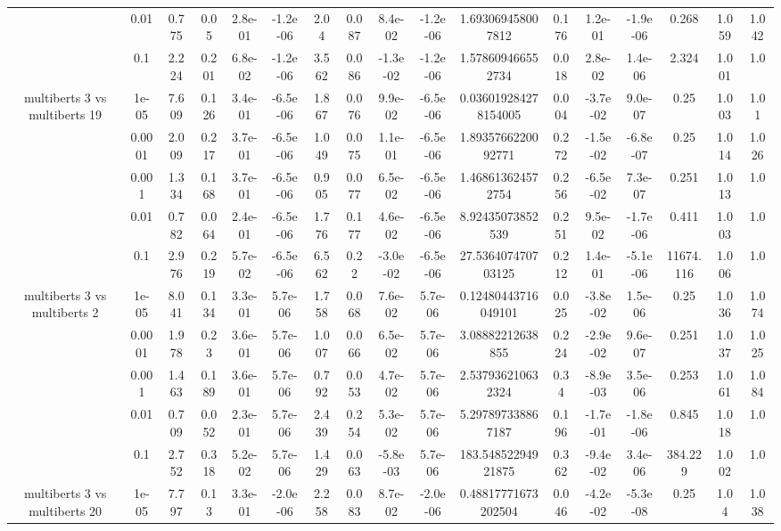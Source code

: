 \begin{tabular}{|c|c|c|c|c|c|c|c|c|c|c|c|c|c|c|c|c|}
 & 0.01 & 0.775 & 0.05 & 2.8e-01 & -1.2e-06 & 2.04 & 0.087 & 8.4e-02 & -1.2e-06 & 1.693069458007812 & 0.176 & 1.2e-01 & -1.9e-06 & 0.268 & 1.059 & 1.042 \\
 & 0.1 & 2.224 & 0.201 & 6.8e-02 & -1.2e-06 & 3.562 & 0.086 & -1.3e-02 & -1.2e-06 & 1.578609466552734 & 0.018 & 2.8e-02 & 1.4e-06 & 2.324 & 1.001 & 1.0 \\
\hline
\multirow{5}{*}{multiberts 3 vs multiberts 19} & 1e-05 & 7.609 & 0.126 & 3.4e-01 & -6.5e-06 & 1.867 & 0.076 & 9.9e-02 & -6.5e-06 & 0.036019284278154005 & 0.004 & -3.7e-02 & 9.0e-07 & 0.25 & 1.003 & 1.01 \\
 & 0.0001 & 2.009 & 0.217 & 3.7e-01 & -6.5e-06 & 1.049 & 0.075 & 1.1e-01 & -6.5e-06 & 1.8935766220092771 & 0.272 & -1.5e-02 & -6.8e-07 & 0.25 & 1.014 & 1.026 \\
 & 0.001 & 1.334 & 0.168 & 3.7e-01 & -6.5e-06 & 0.905 & 0.077 & 6.5e-02 & -6.5e-06 & 1.468613624572754 & 0.256 & -6.5e-02 & 7.3e-07 & 0.251 & 1.013 & 1.0 \\
 & 0.01 & 0.782 & 0.064 & 2.4e-01 & -6.5e-06 & 1.776 & 0.177 & 4.6e-02 & -6.5e-06 & 8.92435073852539 & 0.251 & 9.5e-02 & -1.7e-06 & 0.411 & 1.003 & 1.0 \\
 & 0.1 & 2.976 & 0.219 & 5.7e-02 & -6.5e-06 & 6.562 & 0.22 & -3.0e-02 & -6.5e-06 & 27.536407470703125 & 0.212 & 1.4e-01 & -5.1e-06 & 11674.116 & 1.006 & 1.0 \\
\hline
\multirow{5}{*}{multiberts 3 vs multiberts 2} & 1e-05 & 8.041 & 0.134 & 3.3e-01 & 5.7e-06 & 1.758 & 0.068 & 7.6e-02 & 5.7e-06 & 0.12480443716049101 & 0.025 & -3.8e-02 & 1.5e-06 & 0.25 & 1.036 & 1.074 \\
 & 0.0001 & 1.978 & 0.23 & 3.6e-01 & 5.7e-06 & 1.007 & 0.066 & 6.5e-02 & 5.7e-06 & 3.08882212638855 & 0.224 & -2.9e-02 & 9.6e-07 & 0.251 & 1.037 & 1.025 \\
 & 0.001 & 1.463 & 0.189 & 3.6e-01 & 5.7e-06 & 0.792 & 0.053 & 4.7e-02 & 5.7e-06 & 2.537936210632324 & 0.34 & -8.9e-03 & 3.5e-06 & 0.253 & 1.061 & 1.084 \\
 & 0.01 & 0.709 & 0.052 & 2.3e-01 & 5.7e-06 & 2.439 & 0.254 & 5.3e-02 & 5.7e-06 & 5.297897338867187 & 0.196 & -1.7e-01 & -1.8e-06 & 0.845 & 1.018 & 1.0 \\
 & 0.1 & 2.752 & 0.318 & 5.2e-02 & 5.7e-06 & 1.429 & 0.063 & -5.8e-03 & 5.7e-06 & 183.54852294921875 & 0.362 & -9.4e-02 & 3.4e-06 & 384.229 & 1.002 & 1.0 \\
\hline
\multirow{5}{*}{multiberts 3 vs multiberts 20} & 1e-05 & 7.797 & 0.13 & 3.3e-01 & -2.0e-06 & 2.258 & 0.083 & 8.7e-02 & -2.0e-06 & 0.48817771673202504 & 0.046 & -4.2e-02 & -5.3e-08 & 0.25 & 1.04 & 1.038 \\

\end{tabular}
